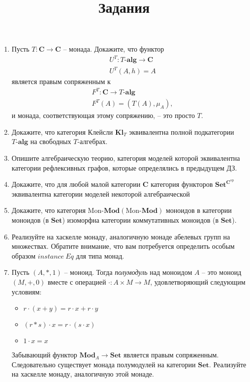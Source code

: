 \documentclass[draft]{article}
\newcommand{\cat}[1]{\mathbf{#1}}
\renewcommand{\C}{\cat{C}}
\newcommand{\Set}{\cat{Set}}
\newcommand{\fs}[1]{\mathrm{#1}}
\newcommand{\Mod}[1]{#1\text{-}\cat{Mod}}
\begin{document}
\title{Задания}
\maketitle

\begin{enumerate}

\item Пусть $T : \C \to \C$ -- монада.
Докажите, что функтор
\begin{align*}
& U^T : T\text{-}\cat{alg} \to \C \\
& U^T(A,h) = A
\end{align*}
является правым сопряженным к
\begin{align*}
& F^T : \C \to T\text{-}\cat{alg} \\
& F^T(A) = (T(A), \mu_A),
\end{align*}
и монада, соответствующая этому сопряжению, -- это просто $T$.

\item Докажите, что категория Клейсли $\cat{Kl}_T$ эквивалентна полной подкатегории $T\text{-}\cat{alg}$ на свободных $T$-алгебрах.

\item Опишите алгебраическую теорию, категория моделей которой эквивалентна категории рефлексивных графов, которые определялись в предыдущем ДЗ.

\item Докажите, что для любой малой категории $\C$ категория функторов $\Set^{\C^\fs{op}}$ эквивалентна категории моделей некоторой алгебраической 

\item Докажите, что категория $\Mod{\fs{Mon}}(\Mod{\fs{Mon}})$ моноидов в категории моноидов (в $\Set$) изоморфна категории коммутативных моноидов (в $\Set$).

\item Реализуйте на хаскелле монаду, аналогичную монаде абелевых групп на множествах.
Обратите внимание, что вам потребуется определить особым образом $\mathit{instance}\ \mathit{Eq}$ для типа монад.

\item Пусть $(A,*,1)$ -- моноид.
Тогда \emph{полумодуль} над моноидом $A$ -- это моноид $(M,+,0)$ вместе с операцией $\cdot : A \times M \to M$, удовлетворяющий следующим условиям:
\begin{itemize}
\item $r \cdot (x + y) = r \cdot x + r \cdot y$
\item $(r * s) \cdot x = r \cdot (s \cdot x)$
\item $1 \cdot x = x$
\end{itemize}
Забывающий функтор $\cat{Mod}_A \to \Set$ является правым сопряженным.
Следовательно существует монада полумодулей на категории $\Set$.
Реализуйте на хаскелле монаду, аналогичную этой монаде.


\end{enumerate}
\end{document}
